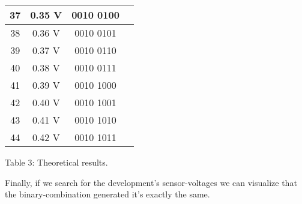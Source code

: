 \begin{center}
\begin{tabular}{c c c c}
\midrule
37 & 0.35 V & 0010 0100 & \\
\midrule
38 & 0.36 V & 0010 0101 & \\
\midrule
39 & 0.37 V & 0010 0110 & \\
\midrule
40 & 0.38 V & 0010 0111 & \\
\midrule
41 & 0.39 V & 0010 1000 & \\
\midrule
42 & 0.40 V & 0010 1001 & \\
\midrule
43 & 0.41 V & 0010 1010 & \\
\midrule
44 & 0.42 V & 0010 1011 & \\
\bottomrule
\end{tabular}
\centering \linebreak \linebreak Table 3: Theoretical results.
\end{center} \hfill \break

Finally, if we search for the development's sensor-voltages we can visualize that the binary-combination generated it's exactly the same. 

\pagebreak